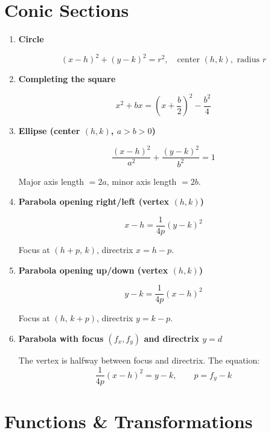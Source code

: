 \documentclass[10pt,letterpaper]{article}
\begin{document}
\section{Conic Sections}

\begin{enumerate}

\item \textbf{Circle}

$$(x-h)^2 + (y-k)^2 = r^2, \quad \text{center } (h,k), \text{ radius } r$$

\item \textbf{Completing the square}

$$x^2 + bx = \left(x + \frac{b}{2}\right)^2 - \frac{b^2}{4}$$

\item \textbf{Ellipse (center $(h,k)$, $a > b > 0$)}

$$\frac{(x-h)^2}{a^2} + \frac{(y-k)^2}{b^2} = 1$$

Major axis length $= 2a$, minor axis length $= 2b$.

\item \textbf{Parabola opening right/left (vertex $(h,k)$)}

$$x - h = \frac{1}{4p}(y-k)^2$$

Focus at $(h+p,\, k)$, directrix $x = h-p$.

\item \textbf{Parabola opening up/down (vertex $(h,k)$)}

$$y - k = \frac{1}{4p}(x-h)^2$$

Focus at $(h,\, k+p)$, directrix $y = k-p$.

\item \textbf{Parabola with focus $(f_x, f_y)$ and directrix $y = d$}

The vertex is halfway between focus and directrix. The equation:
$$\frac{1}{4p}(x-h)^2 = y - k, \qquad p = f_y - k$$

\end{enumerate}

\section{Functions \& Transformations}
\end{document}
